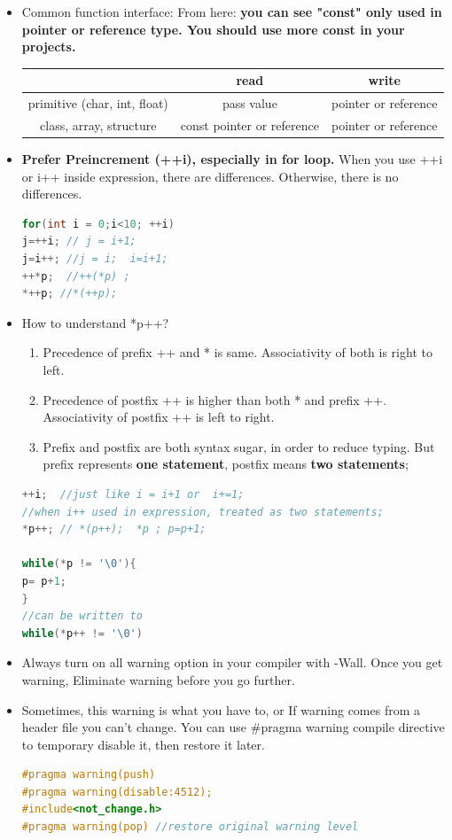 \documentclass[a4paper,12pt,twoside]{book}
\begin{document}
\begin{itemize}
\item Common function interface: From here: \textbf{you can see "const" only used in pointer or reference type. You should use more const in your projects. }

\begin{tabular}{|c|c|c|}
\hline
 & \textbf{read} & \textbf{write} \\
\hline
primitive (char, int, float) & pass value & pointer or reference \\
\hline
class, array, structure  & const pointer or reference &  pointer or reference  \\
\hline
\end{tabular}


\item \textbf{Prefer Preincrement (++i), especially in for loop.}  When you use ++i or i++ inside expression, there are differences. Otherwise, there is no differences.
\begin{lstlisting}[frame=single, language=c++]
for(int i = 0;i<10; ++i)
j=++i; // j = i+1;
j=i++; //j = i;  i=i+1;
++*p;  //++(*p) ;
*++p; //*(++p);
\end{lstlisting}

\item How to understand *p++?
\begin{enumerate}
\item Precedence of prefix ++ and * is same. Associativity of both is right to left.
\item Precedence of postfix ++ is higher than both * and prefix ++. Associativity of postfix ++ is left to right.
\item Prefix and postfix are both syntax sugar, in order to reduce typing.   But prefix represents \textbf{one statement}, postfix means \textbf{two statements};
\end{enumerate}
\begin{lstlisting}[frame=single, language=c++]
++i;  //just like i = i+1 or  i+=1;
//when i++ used in expression, treated as two statements;
*p++; // *(p++);  *p ; p=p+1;

while(*p != '\0'){
p= p+1;
}
//can be written to
while(*p++ != '\0')
\end{lstlisting}

\item Always turn on all warning option in your compiler with -Wall. Once you get warning, Eliminate warning before you go further.

\item Sometimes, this warning is what you have to, or If warning comes from a header file you can't change. You can use \#pragma warning compile directive to temporary disable it, then restore it later.
\begin{lstlisting}[frame=single, language=c++]
#pragma warning(push)
#pragma warning(disable:4512);
#include<not_change.h>
#pragma warning(pop) //restore original warning level
\end{lstlisting}

\end{itemize}
\end{document}
